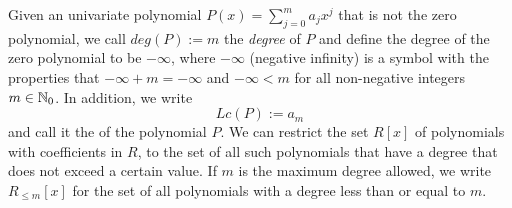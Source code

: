 Given an univariate polynomial $P(x)=\sum_{j=0}^m a_jx^j$ that is not the zero polynomial, we call $deg(P):=m$  the \textit{degree} of $P$ and define the degree of the zero polynomial to be $-\infty$, where $-\infty$ (negative infinity) is a symbol with the properties that $-\infty + m = -\infty$ and $-\infty < m$ for all non-negative integers $m\in\mathbb{N}_0$. In addition, we write 
\begin{equation}
\label{def_leading_coefficient}
Lc(P):=a_m
\end{equation}
and call it the  of the polynomial $P$. We can restrict the set $R[x]$ of  polynomials with coefficients in $R$, to the set of all such polynomials that have a degree that does not exceed a certain value. If $m$ is the maximum degree allowed, we write $R_{\leq m}[x]$ for the set of all polynomials with a degree less than or equal to $m$.
